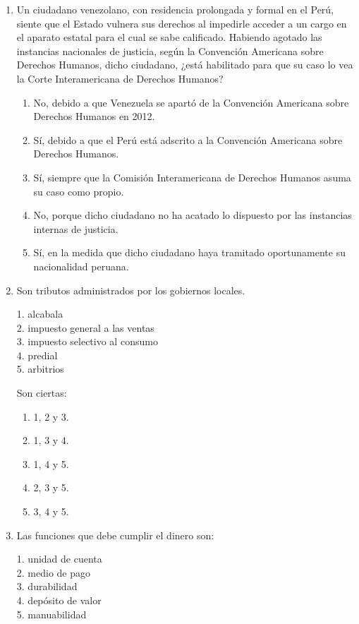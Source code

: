 \begin{enumerate}
	\item Un ciudadano venezolano, con residencia prolongada y formal en el Perú, siente que el Estado vulnera sus derechos al impedirle acceder a un cargo en el aparato estatal para el cual se sabe calificado. Habiendo agotado las instancias nacionales de justicia, según la Convención Americana sobre Derechos Humanos, dicho ciudadano, ¿está habilitado para que su caso lo vea la Corte Interamericana de Derechos Humanos?
	\begin{enumerate}[label=\alph*)]
		\item No, debido a que Venezuela se apartó de la Convención Americana sobre Derechos Humanos en 2012.
		\item Sí, debido a que el Perú está adscrito a la Convención Americana sobre Derechos Humanos.
		\item Sí, siempre que la Comisión Interamericana de Derechos Humanos asuma su caso como propio.
		\item No, porque dicho ciudadano no ha acatado lo dispuesto por las instancias internas de justicia.
		\item Sí, en la medida que dicho ciudadano haya tramitado oportunamente su nacionalidad peruana.
	\end{enumerate}


		\item Son tributos administrados por los gobiernos locales.

	1. alcabala\\
	2. impuesto general a las ventas\\
	3. impuesto selectivo al consumo\\
	4. predial\\
	5. arbitrios

	Son ciertas:
	\begin{enumerate}[label=\alph*)]
		\item 1, 2 y 3.
		\item 1, 3 y 4.
		\item 1, 4 y 5.
		\item 2, 3 y 5.
		\item 3, 4 y 5.
	\end{enumerate}

	\item Las funciones que debe cumplir el dinero son:

	1. unidad de cuenta\\
	2. medio de pago\\
	3. durabilidad\\
	4. depósito de valor\\
	5. manuabilidad


\end{enumerate}
